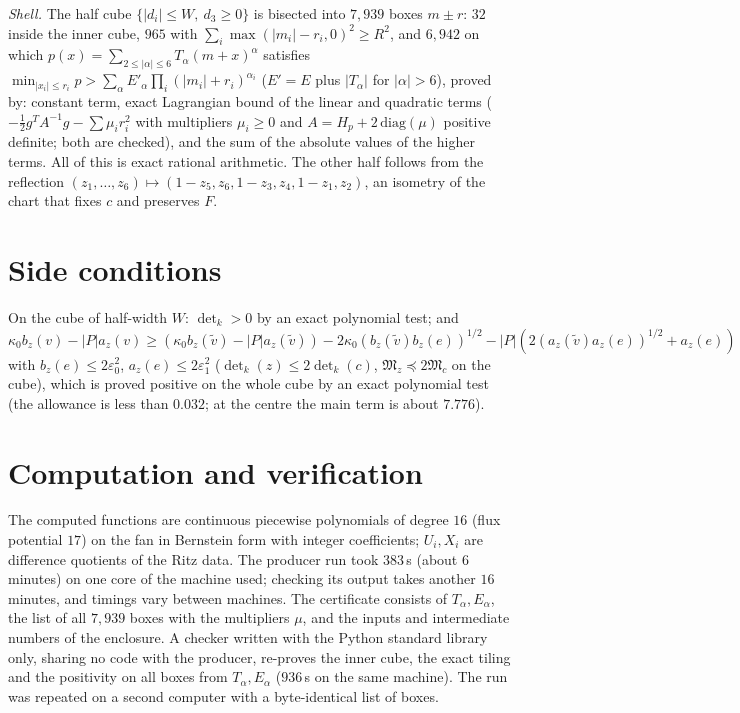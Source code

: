 \documentclass[11pt]{article}
\theoremstyle{remark}
\newcommand{\M}{\mathfrak{M}}
\begin{document}
\emph{Shell.} The half cube $\{|d_i|\le W,\ d_3\ge0\}$ is bisected into $7{,}939$ boxes $m\pm r$: $32$ inside the
inner cube, $965$ with $\sum_i\max(|m_i|-r_i,0)^2\ge R^2$, and $6{,}942$ on which
$p(x)=\sum_{2\le|\alpha|\le6}T_\alpha(m+x)^\alpha$ satisfies $\min_{|x_i|\le r_i}p>\sum_\alpha E'_\alpha\prod_i
(|m_i|+r_i)^{\alpha_i}$ ($E'=E$ plus $|T_\alpha|$ for $|\alpha|>6$), proved by: constant term, exact Lagrangian bound of
the linear and quadratic terms ($-\frac12g^TA^{-1}g-\sum\mu_ir_i^2$ with multipliers $\mu_i\ge0$ and $A=H_p+2\,\mathrm{diag}(\mu)$ positive
definite; both are checked),
and the sum of the absolute values of the higher terms. All of this is exact rational arithmetic. The other half
follows from the reflection $(z_1,\dots,z_6)\mapsto(1-z_5,z_6,1-z_3,z_4,1-z_1,z_2)$, an isometry of the chart that fixes
$c$ and preserves $F$.

\section{Side conditions}\label{sec:side}
On the cube of half-width $W$: $\det_k>0$ by an exact polynomial test; and
$\kappa_0b_z(v)-|P|a_z(v)\ge(\kappa_0b_z(\tilde v)-|P|a_z(\tilde v))-2\kappa_0(b_z(\tilde v)b_z(e))^{1/2}-
|P|(2(a_z(\tilde v)a_z(e))^{1/2}+a_z(e))$ with $b_z(e)\le2\varepsilon_0^2$, $a_z(e)\le2\varepsilon_1^2$
($\det_k(z)\le2\det_k(c)$, $\M_z\preceq2\M_c$ on the cube), which is proved positive on the whole cube by an exact polynomial test (the allowance is less than $0.032$; at the
centre the main term is about $7.776$).

\section{Computation and verification}
The computed functions are continuous piecewise polynomials of degree $16$ (flux potential $17$) on the fan in
Bernstein form with integer coefficients; $U_i,X_i$ are difference quotients of the Ritz data. The producer run took
$383$\,s (about $6$ minutes) on one core of the machine used; checking its output takes another $16$ minutes, and
timings vary between machines. The certificate consists of $T_\alpha,E_\alpha$, the list of all $7{,}939$ boxes with the
multipliers $\mu$, and the inputs and intermediate numbers of the enclosure. A checker written with the Python
standard library only, sharing no code with the producer, re-proves the inner cube, the exact tiling and the positivity
on all boxes from $T_\alpha,E_\alpha$ ($936$\,s on the same machine). The run was repeated on a second computer with a byte-identical
list of boxes.
\end{document}
